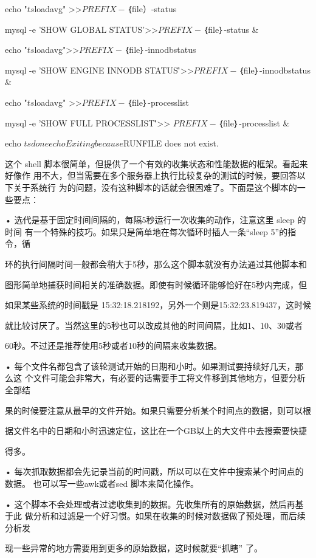 echo "$ts $loadavg" >>$PREFIX-$｛file）-status

mysql -e 'SHOW GLOBAL STATUS'>>$PREFIX-$｛file｝-status &

echo "$ts $loadavg">>$PREFIX-$｛file｝-innodbstatus

mysql -e 'SHOW ENGINE INNODB STATUS\G'>>$PREFIX-$｛file｝-innodbstatus &

echo "$ts $loadavg" >>$PREFIX-$｛file｝-processlist

mysql -e 'SHOW FULL PROCESSLIST\G'>> $PREFIX-$｛file｝-processlist &

echo $ts

done

echo Exiting because $RUNFILE does not exist.

这个 shell 脚本很简单，但提供了一个有效的收集状态和性能数据的框架。看起来好像作
用不大，但当需要在多个服务器上执行比较复杂的测试的时候，要回答以下关于系统行
为的问题，没有这种脚本的话就会很困难了。下面是这个脚本的一些要点：

• 选代是基于固定时间间隔的，每隔5秒运行一次收集的动作，注意这里 sleep 的时间
有一个特殊的技巧。如果只是简单地在每次循环时插人一条“sleep 5”的指令，循

环的执行间隔时间一般都会稍大于5秒，那么这个脚本就没有办法通过其他脚本和

图形简单地捕获时间相关的准确数据。即使有时候循环能够恰好在5秒内完成，但

如果某些系统的时间戳是 15:32:18.218192，另外一个则是15:32:23.819437，这时候

就比较讨厌了。当然这里的5秒也可以改成其他的时间间隔，比如1、10、30或者

60秒。不过还是推荐使用5秒或者10秒的间隔来收集数据。

• 每个文件名都包含了该轮测试开始的日期和小时。如果测试要持续好几天，那么这
个文件可能会非常大，有必要的话需要手工将文件移到其他地方，但要分析全部结

果的时候要注意从最早的文件开始。如果只需要分析某个时间点的数据，则可以根

据文件名中的日期和小时迅速定位，这比在一个GB以上的大文件中去搜索要快捷

得多。

• 每次抓取数据都会先记录当前的时间戳，所以可以在文件中搜索某个时间点的数据。
也可以写一些awk或者sed 脚本来简化操作。

• 这个脚本不会处理或者过滤收集到的数据。先收集所有的原始数据，然后再基于此
做分析和过滤是一个好习惯。如果在收集的时候对数据做了预处理，而后续分析发

现一些异常的地方需要用到更多的原始数据，这时候就要“抓瞎” 了。

